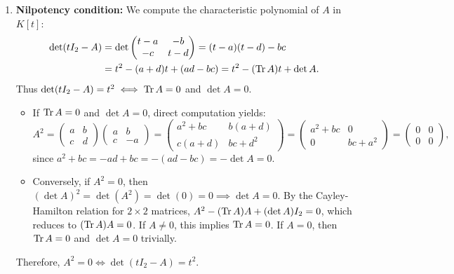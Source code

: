 \begin{exercisesolution}
\begin{enumerate}[label=\textbf{(\alph*)}]
    \item \textbf{Nilpotency condition:}
    We compute the characteristic polynomial of $A$ in $K[t]$:
    \begin{align*}
    \det(tI_2 - A) &= \det \begin{pmatrix} t - a & -b \\ -c & t - d \end{pmatrix} = (t - a)(t - d) - bc \\
    &= t^2 - (a + d)t + (ad - bc) = t^2 - (\operatorname{Tr} A)t + \det A.
    \end{align*}
    Thus $\det(tI_2 - A) = t^2 \iff \operatorname{Tr} A = 0$ and $\det A = 0$.
    \begin{itemize}
        \item If $\operatorname{Tr} A = 0$ and $\det A = 0$, direct computation yields:
        \[
        A^2 = \begin{pmatrix} a & b \\ c & d \end{pmatrix} \begin{pmatrix} a & b \\ c & -a \end{pmatrix} = \begin{pmatrix} a^2 + bc & b(a+d) \\ c(a+d) & bc + d^2 \end{pmatrix} = \begin{pmatrix} a^2 + bc & 0 \\ 0 & bc + a^2 \end{pmatrix} = \begin{pmatrix} 0 & 0 \\ 0 & 0 \end{pmatrix},
        \]
        since $a^2 + bc = -ad + bc = -(ad - bc) = -\det A = 0$.
        \item Conversely, if $A^2 = 0$, then $(\det A)^2 = \det(A^2) = \det(0) = 0 \implies \det A = 0$.
        By the Cayley-Hamilton relation for $2 \times 2$ matrices, $A^2 - (\operatorname{Tr} A)A + (\det A)I_2 = 0$, which reduces to $(\operatorname{Tr} A)A = 0$.
        If $A \ne 0$, this implies $\operatorname{Tr} A = 0$. If $A = 0$, then $\operatorname{Tr} A = 0$ and $\det A = 0$ trivially.
    \end{itemize}
    Therefore, $A^2 = 0 \iff \det(tI_2 - A) = t^2$. \qedhere
\end{enumerate}
\end{exercisesolution}

